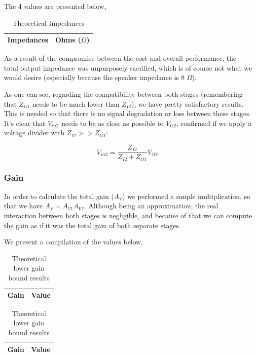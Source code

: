 The 4 values are presented below,

\begin{table}[h]
    \centering
    \begin{tabular}{|l|c|}
    \hline
    {\bf Impedances} & {\bf Ohms ($\Omega$)} \\ \hline
    
    \end{tabular}
    \caption{Theoretical Impedances}
    \label{tab:theo_imp}
\end{table}

As a result of the compromise between the cost and overall performance, the total output impedance was unpurposely sacrified, which is of course not what we would desire (especially because the speaker impedance is 8 $\Omega$). 

As one can see, regarding the compatibility between both stages (remembering that $Z_{O1}$ needs to be  much lower than $Z_{I2}$), we have pretty satisfactory results. This is needed so that there is no signal degradation or loss between these stages. It's clear that $V_{in2}$ needs to be as close as possible to $V_{O2}$, confirmed if we apply a voltage divider with $Z_{I2}>>Z_{O1}$:

\begin{equation}
    V_{in2} = \frac{Z_{I2}}{Z_{I2}+Z_{O1}} V_{O2}. 
\end{equation}

\subsubsection{Gain}

In order to calculate the total gain ($A_{V}$) we performed a simple multiplication, so that we have $A_V=A_{V1}A_{V2}$. Although being an approximation, the real interaction between both stages is negligible, and because of that we can compute the gain as if it was the total gain of both separate stages.

We present a compilation of the values below,


\begin{table}[h]
\parbox{.4\linewidth}{
  \centering
    \begin{tabular}{|l|c|}
    \hline
    {\bf Gain} & {\bf Value} \\ \hline
    
    \end{tabular}
    \caption{Theoretical upper gain bound results}
    \label{tab:theo_gains_high}
  }
  \hfill
  \parbox{.4\textwidth}{
  \centering  
  \begin{tabular}{|c|c|}
    \hline    
    {\bf Gain} & {\bf Value} \\ \hline
    
  \end{tabular}
  \caption{Theoretical lower gain bound results}
  \label{tab:theo_gains_low}
  }
  \end{table}
  
